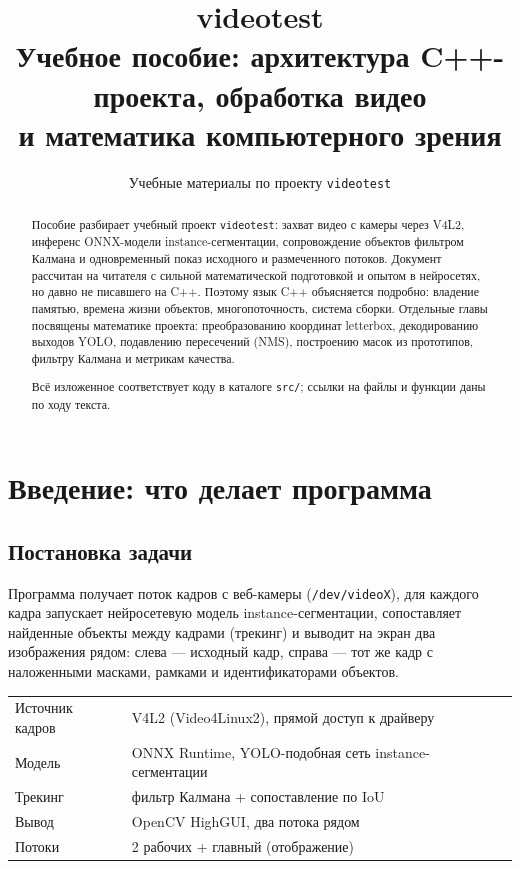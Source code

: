 \documentclass[11pt,a4paper]{article}
\title{\textbf{videotest}\\[2mm]
       \large Учебное пособие: архитектура C++-проекта, обработка видео\\
       и математика компьютерного зрения}
\author{Учебные материалы по проекту \texttt{videotest}}
\date{}
\theoremstyle{definition}
\theoremstyle{remark}
\begin{document}
\maketitle

\begin{abstract}
\noindent
Пособие разбирает учебный проект \texttt{videotest}: захват видео с камеры
через V4L2, инференс ONNX-модели instance-сегментации, сопровождение объектов
фильтром Калмана и одновременный показ исходного и размеченного потоков.
Документ рассчитан на читателя с сильной математической подготовкой и опытом
в нейросетях, но давно не писавшего на C++. Поэтому язык C++ объясняется
подробно: владение памятью, времена жизни объектов, многопоточность,
система сборки. Отдельные главы посвящены математике проекта: преобразованию
координат letterbox, декодированию выходов YOLO, подавлению пересечений (NMS),
построению масок из прототипов, фильтру Калмана и метрикам качества.

Всё изложенное соответствует коду в каталоге \texttt{src/}; ссылки на файлы
и функции даны по ходу текста.
\end{abstract}

\tableofcontents
\newpage

\section{Введение: что делает программа}

\subsection{Постановка задачи}

Программа получает поток кадров с веб-камеры (\texttt{/dev/videoX}), для
каждого кадра запускает нейросетевую модель instance-сегментации, сопоставляет
найденные объекты между кадрами (трекинг) и выводит на экран два изображения
рядом: слева --- исходный кадр, справа --- тот же кадр с наложенными масками,
рамками и идентификаторами объектов.

\begin{center}
\begin{tabular}{ll}
\toprule
Источник кадров & V4L2 (Video4Linux2), прямой доступ к драйверу \\
Модель & ONNX Runtime, YOLO-подобная сеть instance-сегментации \\
Трекинг & фильтр Калмана + сопоставление по IoU \\
Вывод & OpenCV HighGUI, два потока рядом \\
Потоки & 2 рабочих + главный (отображение) \\
\bottomrule
\end{tabular}
\end{center}
\end{document}
